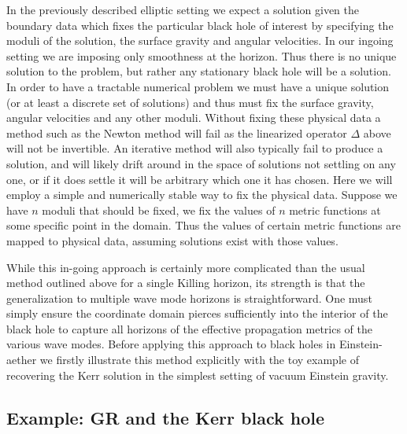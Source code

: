 \documentclass[12pt]{article}
\numberwithin{equation}{section}
\begin{document}
In the previously described elliptic setting we expect a solution given the boundary data which fixes the particular black hole of interest by specifying the moduli of the solution, the surface gravity and angular velocities. In our ingoing setting we are imposing only smoothness at the horizon. Thus there is no unique solution to the problem, but rather any stationary black hole will be a solution. In order to have a tractable numerical problem we must have a unique solution (or at least a discrete set of solutions) and thus must fix the surface gravity, angular velocities and any other moduli. 
%
Without fixing these physical data a method such as the Newton method will fail as the linearized operator $\Delta$ above will not be invertible. An iterative method will also typically fail to produce a solution, and will likely drift around in the space of solutions not settling on any one, or if it does settle it will be arbitrary which one it has chosen.
%
Here we will employ a simple and numerically stable way to fix the physical data. Suppose we have $n$ moduli that should be fixed, we fix the values of $n$ metric functions at some specific point in the domain. 
Thus the values of certain metric functions are mapped to physical data, assuming solutions exist with those values.
%

While this in-going approach is certainly more complicated than the usual method outlined above for a single Killing horizon, its strength is that the generalization to multiple wave mode horizons is straightforward. One must simply ensure the coordinate domain pierces sufficiently into the interior of the black hole to capture all horizons of the effective propagation metrics of the various wave modes. Before applying this approach to black holes in Einstein-aether we firstly illustrate this method explicitly with the toy example of recovering the Kerr solution in the simplest setting of vacuum Einstein gravity.


\subsection{Example: GR and the Kerr black hole}
\label{sec:KerrExample}
\end{document}
